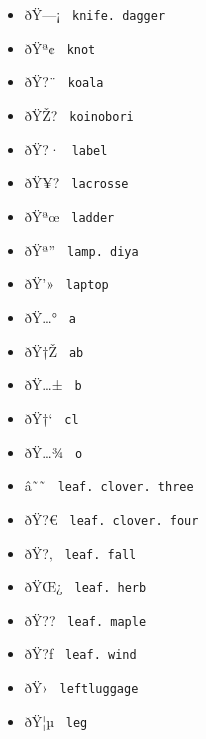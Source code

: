 \begin{itemize}
\item
  \label{symbol-knife.dagger}{{ ðŸ---¡ }
  \texttt{\ knife.\ dagger\ }}
\item
  \label{symbol-knot}{{ ðŸª¢ } \texttt{\ knot\ }}
\item
  \label{symbol-koala}{{ ðŸ?¨ } \texttt{\ koala\ }}
\item
  \label{symbol-koinobori}{{ ðŸŽ? }
  \texttt{\ koinobori\ }}
\item
  \label{symbol-label}{{ ðŸ?· } \texttt{\ label\ }}
\item
  \label{symbol-lacrosse}{{ ðŸ¥? } \texttt{\ lacrosse\ }}
\item
  \label{symbol-ladder}{{ ðŸªœ } \texttt{\ ladder\ }}
\item
  \label{symbol-lamp.diya}{{ ðŸª'' }
  \texttt{\ lamp.\ diya\ }}
\item
  \label{symbol-laptop}{{ ðŸ'» } \texttt{\ laptop\ }}
\item
  \label{symbol-a}{{ ðŸ\ldots° } \texttt{\ a\ }}
\item
  \label{symbol-ab}{{ ðŸ†Ž } \texttt{\ ab\ }}
\item
  \label{symbol-b}{{ ðŸ\ldots± } \texttt{\ b\ }}
\item
  \label{symbol-cl}{{ ðŸ†` } \texttt{\ cl\ }}
\item
  \label{symbol-o}{{ ðŸ\ldots¾ } \texttt{\ o\ }}
\item
  \label{symbol-leaf.clover.three}{{ â˜˜ }
  \texttt{\ leaf.\ clover.\ three\ }}
\item
  \label{symbol-leaf.clover.four}{{ ðŸ?€ }
  \texttt{\ leaf.\ clover.\ four\ }}
\item
  \label{symbol-leaf.fall}{{ ðŸ?‚ }
  \texttt{\ leaf.\ fall\ }}
\item
  \label{symbol-leaf.herb}{{ ðŸŒ¿ }
  \texttt{\ leaf.\ herb\ }}
\item
  \label{symbol-leaf.maple}{{ ðŸ?? }
  \texttt{\ leaf.\ maple\ }}
\item
  \label{symbol-leaf.wind}{{ ðŸ?ƒ }
  \texttt{\ leaf.\ wind\ }}
\item
  \label{symbol-leftluggage}{{ ðŸ› }
  \texttt{\ leftluggage\ }}
\item
  \label{symbol-leg}{{ ðŸ¦µ } \texttt{\ leg\ }}

\end{itemize}
